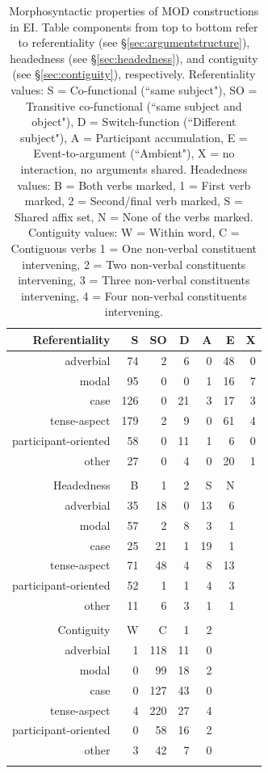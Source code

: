 \begin{table}
\centering
\begin{tabular}{rrrrrrr}
  \lsptoprule
Referentiality & S & SO & D & A & E & X \\ 
  \midrule
  adverbial &  74 &   2 &   6 &   0 &  48 &   0 \\ 
  modal &  95 &   0 &   0 &   1 &  16 &   7 \\ 
  case & 126 &   0 &  21 &   3 &  17 &   3 \\ 
  tense-aspect & 179 &   2 &   9 &   0 &  61 &   4 \\ 
  participant-oriented &  58 &   0 &  11 &   1 &   6 &   0 \\ 
  other &  27 &   0 &   4 &   0 &  20 &   1 \\ 
   \midrule
 \\
  \midrule
Headedness & B & 1 & 2 & S & N \\ 
  \midrule
  adverbial &  35 &  18 &   0 &  13 &   6 \\ 
  modal &  57 &   2 &   8 &   3 &   1 \\ 
  case &  25 &  21 &   1 &  19 &   1 \\ 
  tense-aspect &  71 &  48 &   4 &   8 &  13 \\ 
  participant-oriented &  52 &   1 &   1 &   4 &   3 \\ 
  other &  11 &   6 &   3 &   1 &   1 \\ 
   \midrule
 \\
  \midrule
Contiguity & W & C & 1 & 2 \\ 
  \midrule
  adverbial &   1 & 118 &  11 &   0 \\ 
  modal &   0 &  99 &  18 &   2 \\ 
  case &   0 & 127 &  43 &   0 \\ 
  tense-aspect &   4 & 220 &  27 &   4 \\ 
  participant-oriented &   0 &  58 &  16 &   2 \\ 
  other &   3 &  42 &   7 &   0 \\ 
   \lspbottomrule
\end{tabular}
\caption[Morphosyntactic properties of MOD constructions]{Morphosyntactic properties of MOD constructions in EI. Table components from top to bottom refer to referentiality (see §\ref{sec:argumentstructure}), headedness (see §\ref{sec:headedness}), and contiguity (see §\ref{sec:contiguity}), respectively. Referentiality values: S = Co-functional (``same subject"), SO = Transitive co-functional (``same subject and object"), D = Switch-function (``Different subject"), A = Participant accumulation, E = Event-to-argument (``Ambient"), X = no interaction, no arguments shared. Headedness values: B = Both verbs marked, 1 = First verb marked, 2 = Second/final verb marked, S = Shared affix set, N = None of the verbs marked. Contiguity values: W = Within word, C = Contiguous verbs 1 = One non-verbal constituent intervening, 2 = Two non-verbal constituents intervening, 3 = Three non-verbal constituents intervening, 4 = Four non-verbal constituents intervening.}
\label{table:mod_formal}
\end{table}

